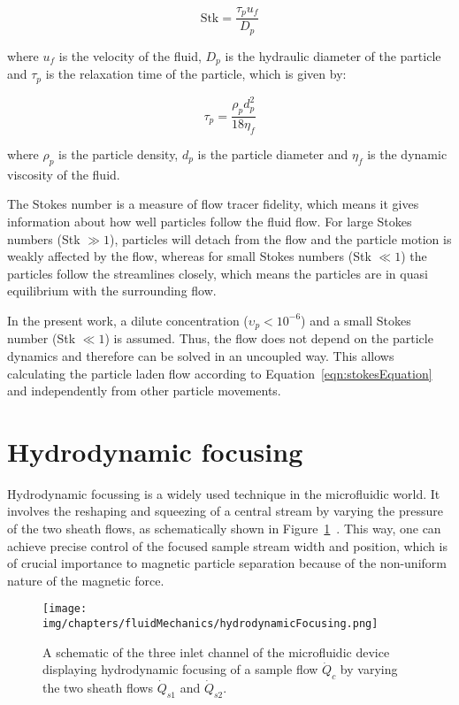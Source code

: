 \begin{equation}
 \text{Stk} = \frac{\tau_{p} u_{f}}{D_{p}}
\end{equation}

where $u_{f}$ is the velocity of the fluid, $D_{p}$ is the hydraulic diameter of the particle and $\tau_{p}$ is the relaxation time of the particle, which is given by:

\begin{equation}
	\tau_{p} = \frac{\rho_{p}d_{p}^{2}}{18\eta_{f}}
\end{equation} 

where $\rho_{p}$ is the particle density, $d_{p}$ is the particle diameter and $\eta_{f}$ is the dynamic viscosity of the fluid. 

The Stokes number is a measure of flow tracer fidelity, which means it gives information about how well particles follow the fluid flow. For large Stokes numbers (Stk $\gg 1$), particles will detach from the flow and the particle motion is weakly affected by the flow, whereas for small Stokes numbers (Stk $\ll 1$) the particles follow the streamlines closely, which means the particles are in quasi equilibrium with the surrounding flow.

In the present work, a dilute concentration ($\upsilon_{p} < 10^{-6}$) and a small Stokes number (Stk $\ll 1$) is assumed. Thus, the flow does not depend on the particle dynamics and therefore can be solved in an uncoupled way. This allows calculating the particle laden flow according to Equation~\ref{eqn:stokesEquation} and independently from other particle movements.

\section{Hydrodynamic focusing}\label{sec:hydrodynamicFocusing}
Hydrodynamic focussing is a widely used technique in the microfluidic world. It involves the reshaping and squeezing of a central stream by varying the pressure of the two sheath flows, as schematically shown in Figure~\ref{fig:hydrodynamicFocusingSchematic}~\cite{Domagalski2007,Golden2012,Dziubinski2015}. This way, one can achieve precise control of the focused sample stream width and position, which is of crucial importance to magnetic particle separation because of the non-uniform nature of the magnetic force. 

\begin{figure}[htb]
\centering
   \texttt{[image: img/chapters/fluidMechanics/hydrodynamicFocusing.png]}
	\caption[Hydrodynamic focusing schematic in a three inlet fluidic device]{A schematic of the three inlet channel of the microfluidic device displaying hydrodynamic focusing of a sample flow $\dot{Q}_{c}$ by varying the two sheath flows $\dot{Q}_{s1}$ and $\dot{Q}_{s2}$.}%
\label{fig:hydrodynamicFocusingSchematic}%
\end{figure} 

